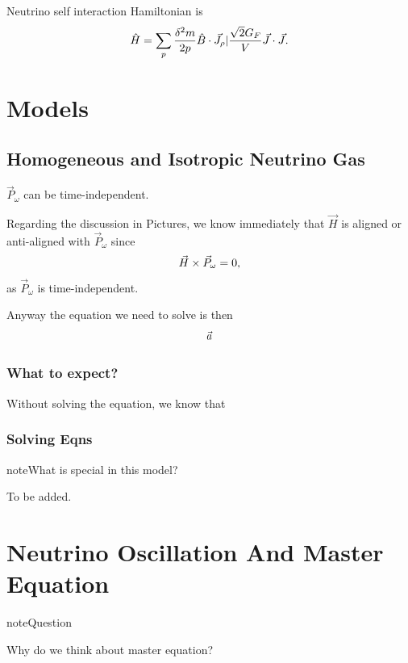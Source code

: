 \documentclass[letterpaper,12pt,english]{sphinxmanual}
\begin{document}
Neutrino self interaction Hamiltonian is
\begin{gather}
\begin{split}\hat H = \sum_p \frac{\delta^2m}{2p}\hat B\cdot \vec J_\rho | \frac{\sqrt{2}G_F}{V}\vec J\cdot \vec J.\end{split}\notag
\end{gather}

\chapter{Models}
\label{models:models}\label{models::doc}

\section{Homogeneous and Isotropic Neutrino Gas}
\label{models:homogeneous-and-isotropic-neutrino-gas}
\(\vec P_\omega\) can be time-independent.

Regarding the discussion in Pictures, we know immediately that \(\vec H\) is aligned or anti-aligned with \(\vec P_\omega\) since
\begin{gather}
\begin{split}\vec H \times \vec P_\omega = 0,\end{split}\notag
\end{gather}
as \(\vec P_\omega\) is time-independent.

Anyway the equation we need to solve is then
\begin{gather}
\begin{split}\vec a\end{split}\notag
\end{gather}

\subsection{What to expect?}
\label{models:what-to-expect}
Without solving the equation, we know that


\subsection{Solving Eqns}
\label{models:solving-eqns}
\begin{notice}{note}{What is special in this model?}

To be added.
\end{notice}


\chapter{Neutrino Oscillation And Master Equation}
\label{mastereqn:neutrino-oscillation-and-master-equation}\label{mastereqn::doc}
\begin{notice}{note}{Question}

Why do we think about master equation?
\end{notice}
\end{document}
